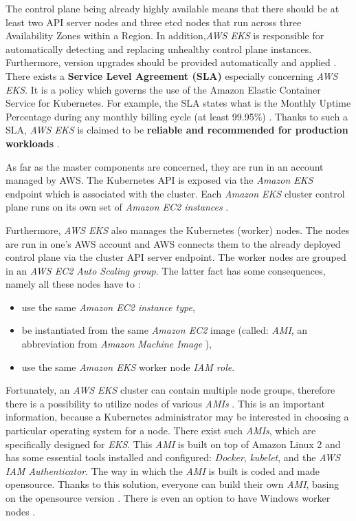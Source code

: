 The control plane being already highly available means that there should be at least two API server nodes and three etcd nodes that run across three Availability Zones within a Region. In addition,\textit{AWS EKS} is responsible for automatically detecting and replacing unhealthy control plane instances. Furthermore, version upgrades should be provided automatically and applied \cite{what-is-eks}. There exists a \textbf{Service Level Agreement (SLA)} especially concerning \textit{AWS EKS}. It is a policy which governs the use of the Amazon Elastic Container Service for Kubernetes. For example, the SLA states what is the Monthly Uptime Percentage during any monthly billing cycle (at least 99.95\%) \cite{eks-sla}. Thanks to such a SLA, \textit{AWS EKS} is claimed to be \textbf{reliable and recommended for production workloads} \cite{what-is-eks}.

As far as the master components are concerned, they are run in an account managed by AWS. The Kubernetes API is exposed via the \textit{Amazon EKS} endpoint which is associated with the cluster. Each \textit{Amazon EKS} cluster control plane runs on its own set of \textit{Amazon EC2 instances} \cite{eks-clusters}.

Furthermore, \textit{AWS EKS} also manages the Kubernetes (worker) nodes. The nodes are run in one's AWS account and AWS connects them to the already deployed control plane via the cluster API server endpoint. The worker nodes are grouped in an \textit{AWS EC2 Auto Scaling group}. The latter fact has some consequences, namely all these nodes have to \cite{eks-worker}:
\begin{itemize}
\item use the same \textit{Amazon EC2 instance type},
\item be instantiated from the same \textit{Amazon EC2} image (called: \textit{AMI}, an abbreviation from \textit{Amazon Machine Image} \cite{aws-ami}),
\item use the same \textit{Amazon EKS} worker node \textit{IAM role}.
\end{itemize}

Fortunately, an \textit{AWS EKS} cluster can contain multiple node groups, therefore there is a possibility to utilize nodes of various \textit{AMIs}  \cite{eks-worker}. This is an important information, because a Kubernetes administrator may be interested in choosing a particular operating system for a node. There exist such \textit{AMIs}, which are specifically designed for \textit{EKS}. This \textit{AMI} is built on top of Amazon Linux 2 and has some essential tools installed and configured: \textit{Docker}, \textit{kubelet}, and the \textit{AWS IAM Authenticator}. The way in which the \textit{AMI} is built is coded and made opensource. Thanks to this solution, everyone can build their own \textit{AMI}, basing on the opensource version  \cite{eks-optimized-ami}. There is even an option to have Windows worker nodes \cite{eks-worker-win}.

